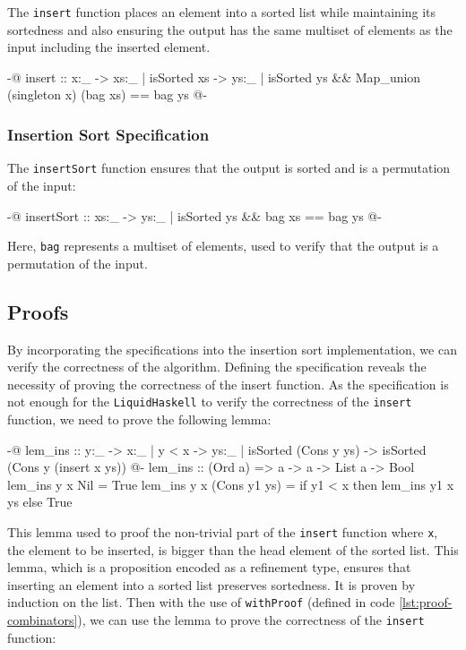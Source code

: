 \documentclass[]{rptuseminar}
\begin{document}
The \texttt{insert} function places an element into a sorted list while maintaining its sortedness and also ensuring
the output has the same multiset of elements as the input including the inserted element.

\begin{haskell}
{-@ insert :: x:_ -> {xs:_ | isSorted xs} 
  -> {ys:_ | isSorted ys && Map_union (singleton x) (bag xs) == bag ys  } @-}
\end{haskell}

\subsubsection{Insertion Sort Specification}

The \texttt{insertSort} function ensures that the output is sorted and is a permutation of the input:

\begin{haskell}
{-@ insertSort :: xs:_ -> {ys:_ | isSorted ys && bag xs == bag ys} @-}
\end{haskell}

Here, \texttt{bag} represents a multiset of elements, used to verify that the output is a permutation of the input.

\subsection{Proofs}
By incorporating the specifications into the insertion sort implementation, we can verify the correctness of the algorithm.
Defining the specification reveals the necessity of proving the correctness of the insert function.
As the specification is not enough for the \texttt{LiquidHaskell} to verify the correctness of the \texttt{insert} function, 
we need to prove the following lemma:

\begin{haskell}
{-@ lem_ins :: y:_ -> {x:_ | y < x} -> {ys:_ | isSorted (Cons y ys)} 
    -> {isSorted (Cons y (insert x ys))} @-}
lem_ins :: (Ord a) => a -> a -> List a -> Bool
lem_ins y x Nil = True
lem_ins y x (Cons y1 ys) = if y1 < x then lem_ins y1 x ys else True
\end{haskell}

This lemma used to proof the non-trivial part of the \texttt{insert} function where \texttt{x}, the element to be inserted, is
bigger than the head element of the sorted list. This lemma, which is a proposition encoded as a refinement type, 
ensures that inserting an element into a sorted list preserves sortedness. It is proven by induction on the list. 
Then with the use of \texttt{withProof} (defined in code \ref{lst:proof-combinators}), we can use the lemma to prove 
the correctness of the \texttt{insert} function:
\end{document}
